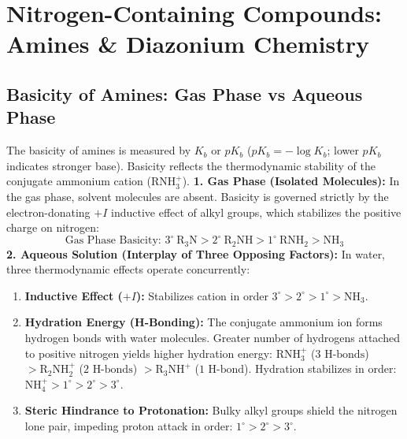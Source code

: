 \documentclass[10pt,twoside,openright]{book}
\begin{document}
\section{Nitrogen-Containing Compounds: Amines \& Diazonium Chemistry}

\subsection{Basicity of Amines: Gas Phase vs Aqueous Phase}

\begin{conceptbox}
The basicity of amines is measured by $K_b$ or $pK_b$ ($pK_b = -\log K_b$; lower $pK_b$ indicates stronger base). Basicity reflects the thermodynamic stability of the conjugate ammonium cation ($\mathrm{RNH_3^+}$).
\textbf{1. Gas Phase (Isolated Molecules):}
In the gas phase, solvent molecules are absent. Basicity is governed strictly by the electron-donating $+I$ inductive effect of alkyl groups, which stabilizes the positive charge on nitrogen:
\begin{equation}
  \text{Gas Phase Basicity: } 3^\circ \ \mathrm{R_3N} > 2^\circ \ \mathrm{R_2NH} > 1^\circ \ \mathrm{RNH_2} > \mathrm{NH_3}
\end{equation}
\textbf{2. Aqueous Solution (Interplay of Three Opposing Factors):}
In water, three thermodynamic effects operate concurrently:
\begin{enumerate}
  \item \textbf{Inductive Effect ($+I$):} Stabilizes cation in order $3^\circ > 2^\circ > 1^\circ > \mathrm{NH_3}$.
  \item \textbf{Hydration Energy (H-Bonding):} The conjugate ammonium ion forms hydrogen bonds with water molecules. Greater number of hydrogens attached to positive nitrogen yields higher hydration energy: $\mathrm{RNH_3^+}$ ($3\text{ H-bonds}$) $> \mathrm{R_2NH_2^+}$ ($2\text{ H-bonds}$) $> \mathrm{R_3NH^+}$ ($1\text{ H-bond}$). Hydration stabilizes in order: $\mathrm{NH_4^+} > 1^\circ > 2^\circ > 3^\circ$.
  \item \textbf{Steric Hindrance to Protonation:} Bulky alkyl groups shield the nitrogen lone pair, impeding proton attack in order: $1^\circ > 2^\circ > 3^\circ$.
\end{enumerate}
\end{conceptbox}
\end{document}
